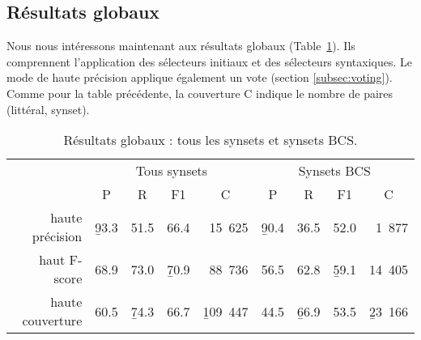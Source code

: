 
\subsection{Résultats globaux}
\label{subsec:allvsbcs}

Nous nous intéressons maintenant aux résultats globaux
(Table~\ref{table:allvsbcs}). Ils comprennent l'application des sélecteurs
initiaux et des sélecteurs syntaxiques. Le mode de haute précision applique
également un vote (section \ref{subsec:voting}). Comme pour la table
précédente, la couverture C indique le nombre de paires (littéral, synset).

\begin{table}[ht]
\centering
\begin{tabular}{rcccc|cccc}
  \toprule
                   & \multicolumn{4}{c}{Tous synsets} & \multicolumn{4}{c}{Synsets BCS}     \\
                   &   P      &    R     &   F1     &   C         &   P      &   R      &   F1     &   C    \\
  haute précision  & \b{93.3} & 51.5     & 66.4     & ~15~625     & \b{90.4} & 36.5     & 52.0     & ~1~877 \\
  haut F-score     & 68.9     & 73.0     & \b{70.9} & ~88~736     & 56.5     & 62.8     & \b{59.1} & 14~405 \\
  haute couverture & 60.5     & \b{74.3} & 66.7     & \b{109~447} & 44.5     & \b{66.9} & 53.5     & \b{23~166} \\
  \bottomrule
\end{tabular}
\caption{\protect\centering\label{table:allvsbcs}Résultats globaux : tous les synsets et synsets BCS.}
\end{table}


